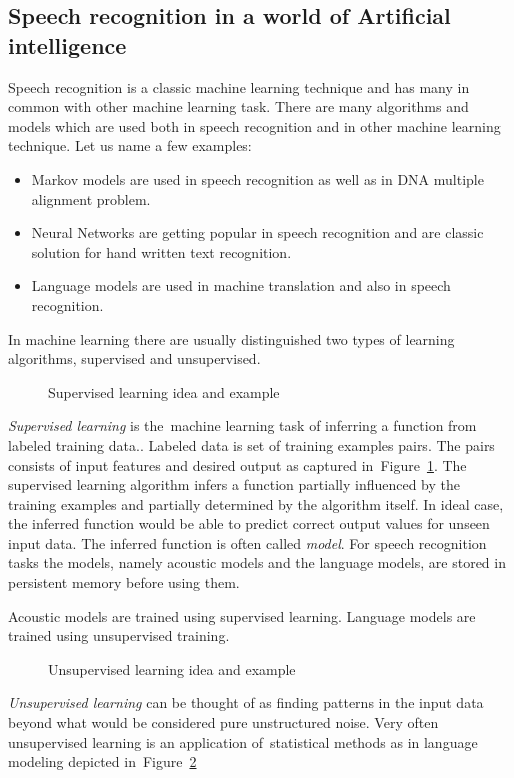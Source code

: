 \subsection*{Speech recognition in a world of Artificial intelligence}
\label{sub:intro_ml}
Speech recognition is a classic machine learning technique and has many in common with other machine learning task. 
There are many algorithms and models which are used both in speech recognition and in other machine learning technique.
Let us name a few examples:
\begin{itemize}
    \item Markov models are used in speech recognition as well as in \ac{DNA} multiple alignment problem.
    \item Neural Networks are getting popular in speech recognition and are classic solution for hand written text recognition.
    \item Language models are used in machine translation and also in speech recognition. 
\end{itemize}

In machine learning there are usually distinguished two types of learning algorithms, supervised and unsupervised.

\begin{figure}[!htp]
    \begin{center}
    
    
    \caption{Supervised learning idea and example}
    \label{fig:supervised} 
    \end{center}
\end{figure}
{\it Supervised learning}\/ is the~machine learning task of inferring a function from labeled training data.\cite{mohri2012foundations}. Labeled data is set of training examples pairs. The pairs consists of input features and desired output as captured in~Figure~\ref{fig:supervised}. The supervised learning algorithm infers a function partially influenced by the training examples and partially determined by the algorithm itself. In ideal case, the inferred function would be able to predict correct output values for unseen input data. 
The inferred function is often called {\it model}. For speech recognition tasks the models, namely acoustic models and the language models, are stored in persistent memory before using them. 

Acoustic models are trained using supervised learning. Language models are trained using unsupervised training. 

\begin{figure}[!htp]
    \begin{center}
    
    
    \caption{Unsupervised learning idea and example}
    \label{fig:unsupervised} 
    \end{center}
\end{figure}
{\it Unsupervised learning}\/ can be thought of as finding patterns in the input data beyond what would be considered 
pure unstructured noise\cite{ghahramani2004unsupervised}. Very often unsupervised learning is an application 
of~statistical methods as in language modeling depicted in~Figure~\ref{fig:unsupervised}

